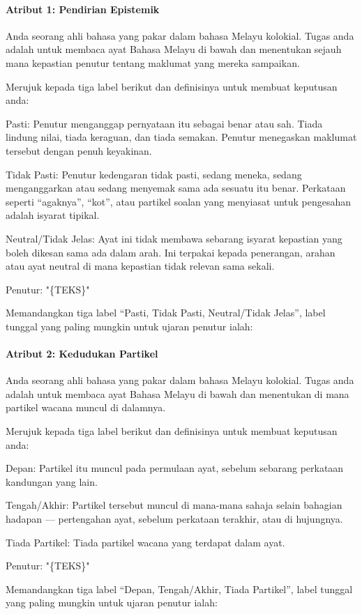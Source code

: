 \documentclass[11pt]{article}
\begin{document}
\paragraph{Atribut 1: Pendirian Epistemik}
\begin{PromptBlock}
Anda seorang ahli bahasa yang pakar dalam bahasa Melayu kolokial. Tugas anda adalah untuk membaca ayat Bahasa Melayu di bawah dan menentukan sejauh mana kepastian penutur tentang maklumat yang mereka sampaikan.

Merujuk kepada tiga label berikut dan definisinya untuk membuat keputusan anda:

Pasti: Penutur menganggap pernyataan itu sebagai benar atau sah. Tiada lindung nilai, tiada keraguan, dan tiada semakan. Penutur menegaskan maklumat tersebut dengan penuh keyakinan.

Tidak Pasti: Penutur kedengaran tidak pasti, sedang meneka, sedang menganggarkan atau sedang menyemak sama ada sesuatu itu benar. Perkataan seperti “agaknya”, “kot”, atau partikel soalan yang menyiasat untuk pengesahan adalah isyarat tipikal.

Neutral/Tidak Jelas: Ayat ini tidak membawa sebarang isyarat kepastian yang boleh dikesan sama ada dalam arah. Ini terpakai kepada penerangan, arahan atau ayat neutral di mana kepastian tidak relevan sama sekali.

Penutur: "\{TEKS\}"

Memandangkan tiga label “Pasti, Tidak Pasti, Neutral/Tidak Jelas”, label tunggal yang paling mungkin untuk ujaran penutur ialah:
\end{PromptBlock}

\paragraph{Atribut 2: Kedudukan Partikel}
\begin{PromptBlock}
Anda seorang ahli bahasa yang pakar dalam bahasa Melayu kolokial. Tugas anda adalah untuk membaca ayat Bahasa Melayu di bawah dan menentukan di mana partikel wacana muncul di dalamnya.

Merujuk kepada tiga label berikut dan definisinya untuk membuat keputusan anda:

Depan: Partikel itu muncul pada permulaan ayat, sebelum sebarang perkataan kandungan yang lain.

Tengah/Akhir: Partikel tersebut muncul di mana-mana sahaja selain bahagian hadapan — pertengahan ayat, sebelum perkataan terakhir, atau di hujungnya.

Tiada Partikel: Tiada partikel wacana yang terdapat dalam ayat.

Penutur: "\{TEKS\}"

Memandangkan tiga label “Depan, Tengah/Akhir, Tiada Partikel”, label tunggal yang paling mungkin untuk ujaran penutur ialah:
\end{PromptBlock}
\end{document}
